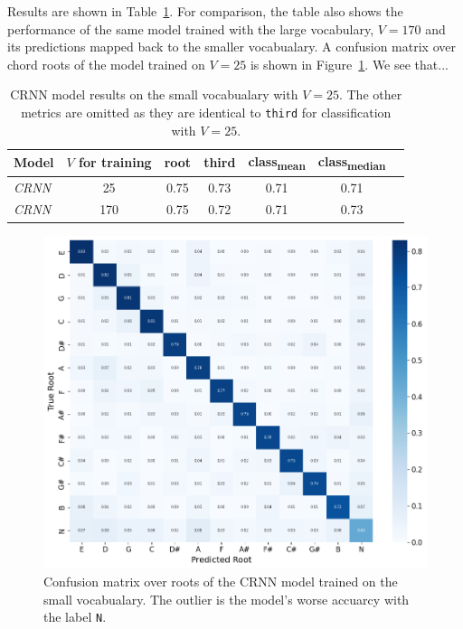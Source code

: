 Results are shown in Table~\ref{tab:crnn_small_vocab}. For comparison, the table also shows the performance of the same model trained with the large vocabulary, $V=170$ and its predictions mapped back to the smaller vocabualary. A confusion matrix over chord roots of the model trained on $V=25$ is shown in Figure~\ref{fig:crnn_small_vocab_cm}. We see that...


\begin{table}[h]
    \centering
    \begin{tabular}{lcccccc}
        \toprule
        Model & $V$ for training & root & third & class\textsubscript{mean} & class\textsubscript{median} \\  
        \midrule
        \emph{CRNN} & 25 & 0.75 & 0.73 & 0.71 & 0.71 \\
        \emph{CRNN} & 170 & 0.75 & 0.72 & 0.71 & 0.73 \\
        \bottomrule
    \end{tabular}
    \caption{CRNN model results on the small vocabualary with $V=25$. The other metrics are omitted as they are identical to \texttt{third} for classification with $V=25$.}
    \label{tab:crnn_small_vocab}
\end{table}

\begin{figure}[h]
    \centering
    \includegraphics[width=1.0\textwidth]{figures/small_vocab_root_cm.png}
    \caption{Confusion matrix over roots of the CRNN model trained on the small vocabualary. The outlier is the model's worse accuarcy with the label \texttt{N}.}\label{fig:crnn_small_vocab_cm}
\end{figure}


